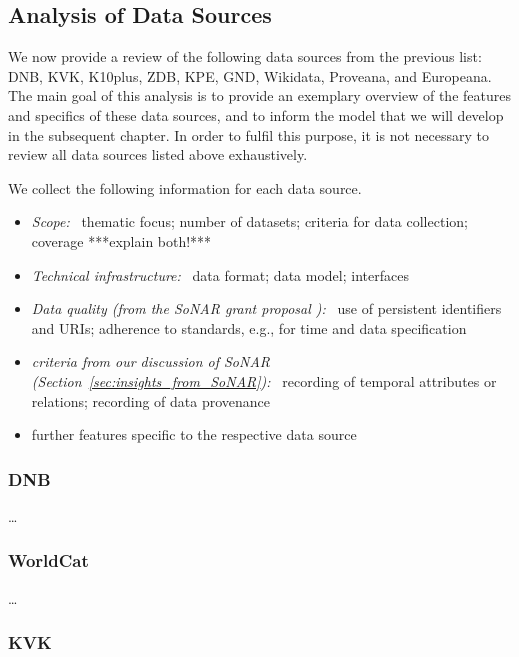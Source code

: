 \subsection{Analysis of Data Sources}

We now provide a review of the following data sources from the previous list:
\gls{DNB}, \gls{KVK}, \gls{K10plus}, \gls{ZDB}, \gls{KPE}, \gls{GND}, Wikidata, Proveana, and Europeana.
The main goal of this analysis is to provide an exemplary overview of the features and specifics
of these data sources, and to inform the model that we will develop in the subsequent chapter.
In order to fulfil this purpose, it is not necessary to review all data sources listed above
exhaustively.

We collect the following information for each data source.
%
\begin{itemize}
  \item
    \emph{Scope:}~
    thematic focus; number of datasets; criteria for data collection; coverage ***explain both!***
  \item
    \emph{Technical infrastructure:}~
    data format; data model; interfaces
  \item
    \emph{Data quality (from the \gls{SoNAR} grant proposal \autocite[p.\,19ff.]{SchneiderKempf2018}):}~
    use of persistent identifiers and URIs; adherence to standards, e.g., for time and data specification
  \item
    \emph{criteria from our discussion of \gls{SoNAR} (Section~\ref{sec:insights_from_SoNAR}):}~
    recording of temporal attributes or relations; recording of data provenance
  \item
    further features specific to the respective data source
\end{itemize}

\subsubsection{DNB}

\dots


\subsubsection{WorldCat}

\dots

\subsubsection{KVK}

